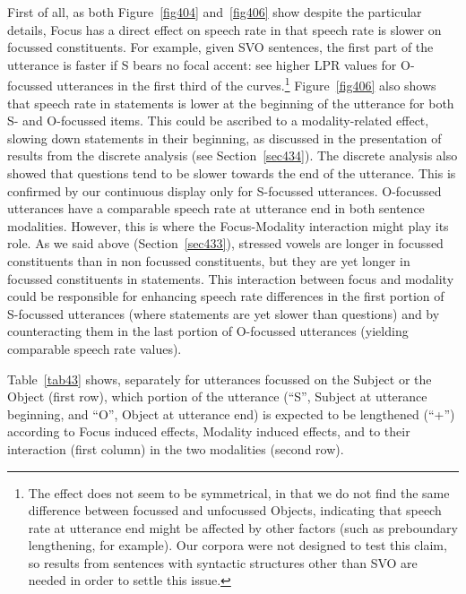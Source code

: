 First of all, as both Figure~\ref{fig404} and~\ref{fig406} show despite the particular details, Focus has a direct effect on speech rate in that speech rate is slower on focussed constituents. For example, given SVO sentences, the first part of the utterance is faster if S bears no focal accent: see higher LPR values for O-focussed utterances in the first third of the curves.\footnote{The effect does not seem to be symmetrical, in that we do not find the same difference between focussed and unfocussed Objects, indicating that speech rate at utterance end might be affected by other factors (such as preboundary lengthening, for example). Our corpora were not designed to test this claim, so results from sentences with syntactic structures other than SVO are needed in order to settle this issue.} Figure~\ref{fig406} also shows that speech rate in statements is lower at the beginning of the utterance for both S- and O-focussed items. This could be ascribed to a modality-related effect, slowing down statements in their beginning, as discussed in the presentation of results from the discrete analysis (see Section~\ref{sec434}). The discrete analysis also showed that questions tend to be slower towards the end of the utterance. This is confirmed by our continuous display only for S-focussed utterances. O-focussed utterances have a comparable speech rate at utterance end in both sentence modalities. However, this is where the Focus-Modality interaction might play its role. As we said above (Section~\ref{sec433}), stressed vowels are longer in focussed constituents than in non focussed constituents, but they are yet longer in focussed constituents in statements. This interaction between focus and modality could be responsible for enhancing speech rate differences in the first portion of S-focussed utterances (where statements are yet slower than questions) and by counteracting them in the last portion of O-focussed utterances (yielding comparable speech rate values). 

Table~\ref{tab43} shows, separately for utterances focussed on the Subject or the Object (first row), which portion of the utterance (``S'', Subject at utterance beginning, and ``O'', Object at utterance end) is expected to be lengthened (``+'') according to Focus induced effects, Modality induced effects, and to their interaction (first column) in the two modalities (second row).

